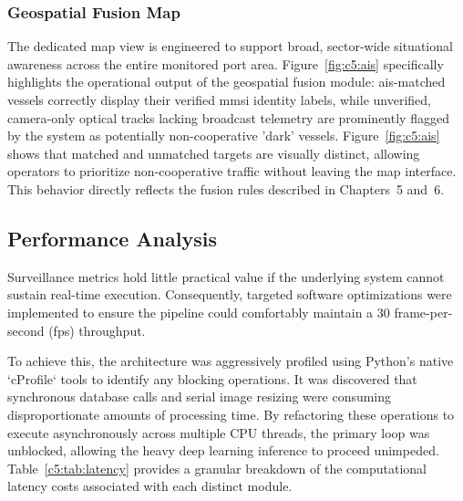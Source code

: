 \subsubsection{Geospatial Fusion Map}
\begin{reportfigblock}
The dedicated map view is engineered to support broad, sector-wide situational awareness across the entire monitored port area. Figure~\ref{fig:c5:ais} specifically highlights the operational output of the geospatial fusion module: \gls{ais}-matched vessels correctly display their verified \gls{mmsi} identity labels, while unverified, camera-only optical tracks lacking broadcast telemetry are prominently flagged by the system as potentially non-cooperative 'dark' vessels.
Figure~\ref{fig:c5:ais} shows that matched and unmatched targets are visually distinct, allowing operators to prioritize non-cooperative traffic without leaving the map interface. This behavior directly reflects the fusion rules described in Chapters~5 and~6.
\end{reportfigblock}

\subsection{Performance Analysis}


Surveillance metrics hold little practical value if the underlying system cannot sustain real-time execution. Consequently, targeted software optimizations were implemented to ensure the pipeline could comfortably maintain a 30 frame-per-second (fps) throughput. 

To achieve this, the architecture was aggressively profiled using Python's native `cProfile` tools to identify any blocking operations. It was discovered that synchronous database calls and serial image resizing were consuming disproportionate amounts of processing time. By refactoring these operations to execute asynchronously across multiple CPU threads, the primary loop was unblocked, allowing the heavy deep learning inference to proceed unimpeded. Table~\ref{c5:tab:latency} provides a granular breakdown of the computational latency costs associated with each distinct module.

